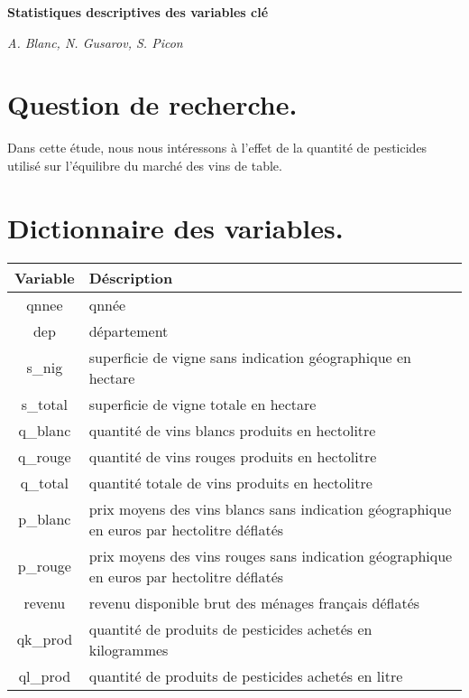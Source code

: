\documentclass[11pt, a4paper]{article}
\begin{document}
\begin{center}
    \Large\textbf{Statistiques descriptives des variables clé}
    \par
    \large\textit{A. Blanc, N. Gusarov, S. Picon}
\end{center}

\section*{Question de recherche.}
Dans cette étude, nous nous intéressons à l’effet de la quantité de pesticides utilisé sur l’équilibre du marché des vins de table.

\section*{Dictionnaire des variables.}
\begin{tabular}{c|l}
  \hline
  Variable & Déscription \\
  \hline
qnnee & qnnée \\
dep & département \\
s\_nig & superficie de vigne sans indication géographique en hectare \\
s\_total & superficie de vigne totale en hectare \\
q\_blanc & quantité de vins blancs produits en hectolitre \\
q\_rouge & quantité de vins rouges produits en hectolitre \\
q\_total & quantité totale de vins produits en hectolitre \\
p\_blanc & prix moyens des vins blancs sans indication géographique en euros par hectolitre déflatés \\
p\_rouge & prix moyens des vins rouges sans indication géographique en euros par hectolitre déflatés \\
revenu & revenu disponible brut des ménages français déflatés \\
qk\_prod & quantité de produits de pesticides achetés en kilogrammes \\
ql\_prod & quantité de produits de pesticides achetés en litre \\
\hline
\end{tabular}
\end{document}
